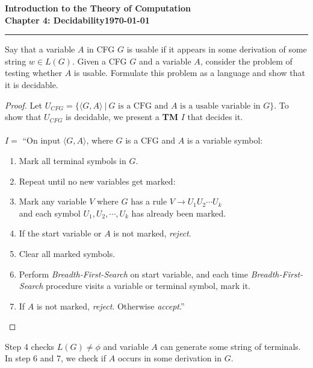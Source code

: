 \documentclass[11pt]{article}
\newcommand{\dated}{\today}
\begin{document}
\textbf{Introduction to the Theory of
Computation}\hfill\textbf{\myname}\\[0.01in]
\textbf{Chapter 4: Decidability}\hfill\textbf{\dated}\\
\smallskip\hrule\bigskip

\begin{problem}{4.31}
Say that a variable $A$ in CFG $G$ is usable if it appears in some derivation of some string $w \in L(G)$. Given a CFG $G$ and a variable $A$, consider the problem of testing whether $A$ is usable. Formulate this problem as a language and show that it is decidable.
\end{problem}

\begin{proof}
Let $U_{CFG} = \{\langle G, A \rangle \ | \ G \text{ is a CFG and } A \text{ is a usable variable in } G \}$. To show that $U_{CFG}$ is decidable, we present a \textbf{TM} $I$ that decides it.  \\
\\
$I =$ \textquotedblleft On input $\langle G, A \rangle$, where $G$ is a CFG and $A$ is a variable symbol:
\begin{enumerate}
\item Mark all terminal symbols in $G$.
\item Repeat until no new variables get marked:
\item \hspace*{0.5cm} Mark any variable $V$ where $G$ has a rule $V \longrightarrow U_1U_2 \cdots U_k$ \\ \hspace*{0.5cm} and each symbol $U_1, U_2, \cdots, U_k$ has already been marked.
\item If the start variable or $A$ is not marked, \textit{reject}.
\item Clear all marked symbols.
\item Perform \textit{Breadth-First-Search} on start variable, and each time \textit{Breadth-First-Search} procedure visits a variable or terminal symbol, mark it.
\item If $A$ is not marked, \textit{reject}. Otherwise \textit{accept}.\textquotedblright
\end{enumerate}
\end{proof}
Step 4 checks $L(G) \neq \phi$ and variable $A$ can generate some string of terminals. In step 6 and 7, we check if $A$ occurs in some derivation in $G$.
\end{document}
